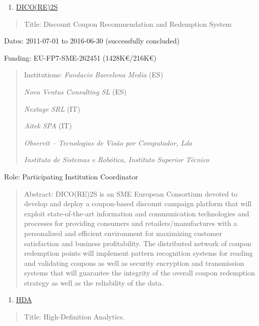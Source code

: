 \begin{enumerate}
\def\labelenumi{\arabic{enumi}.}
\setcounter{enumi}{4}
\item
  \ul{DICO(RE)2S}
\end{enumerate}

\begin{quote}
Title: Discount Coupon Recommendation and Redemption System
\end{quote}

Dates: 2011-07-01 to 2016-06-30 (successfully concluded)

Funding: EU-FP7-SME-262451 (1428K€/216K€)

\begin{quote}
Institutions: \emph{Fundacio Barcelona Media} (ES)

\emph{Nova Ventus Consulting SL} (ES)

\emph{Nextage SRL} (IT)

\emph{Aitek SPA} (IT)

\emph{Observit -- Tecnologias de Visão por Computador, Lda}

\emph{Instituto de Sistemas e Robótica, Instituto Superior Técnico}
\end{quote}

Role: Participating Institution Coordinator

\begin{quote}
Abstract: DICO(RE)2S is an SME European Consortium devoted to develop
and deploy a coupon-based discount campaign platform that will exploit
state-of-the-art information and communication technologies and
processes for providing consumers and retailers/manufactures with a
personalized and efficient environment for maximizing customer
satisfaction and business profitability. The distributed network of
coupon redemption points will implement pattern recognition systems for
reading and validating coupons as well as security encryption and
transmission systems that will guarantee the integrity of the overall
coupon redemption strategy as well as the reliability of the data.
\end{quote}

\begin{enumerate}
\def\labelenumi{\arabic{enumi}.}
\setcounter{enumi}{5}
\item
  \ul{HDA}
\end{enumerate}

\begin{quote}
Title: High-Definition Analytics.
\end{quote}

